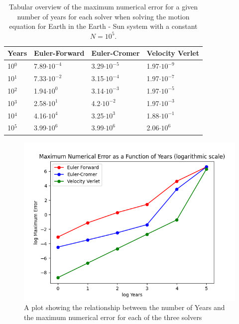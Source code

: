 	\begin{table}[H]
		\centering
		\caption{Tabular overview of the maximum numerical error for a given number of years for each solver when solving the motion equation for Earth in the Earth - Sun system with a constant $N = 10^{5}$.}
		\label{error_constN}
		\begin{tabular}{l|l|l|l}
			Years & Euler-Forward & Euler-Cromer & Velocity Verlet\\
			\hline
			10$^0$ &7.89$\cdot10^{-4}$&3.29$\cdot10^{-5}$ &1.97$\cdot10^{-9}$\\
			10$^1$ &7.33$\cdot10^{-2}$ &3.15$\cdot10^{-4}$ &1.97$\cdot10^{-7}$ \\
			10$^2$ &1.94$\cdot10^{0}$ &3.14$\cdot10^{-3}$ &1.97$\cdot10^{-5}$ \\
			10$^3$ &2.58$\cdot10^{1}$ &4.2$\cdot10^{-2}$ &1.97$\cdot10^{-3}$ \\
			10$^4$ & 4.16$\cdot10^{4}$&3.25$\cdot10^{3}$ &1.88$\cdot10^{-1}$ \\
			10$^5$ &3.99$\cdot10^{6}$ &3.99$\cdot10^{6}$ &2.06$\cdot10^{6}$
		\end{tabular}
	\end{table}
	\begin{figure}[H]
		\includegraphics[width = \linewidth]{Figure/maxerrorplotconstN.png}
		\caption{A plot showing the relationship between the number of Years and the maximum numerical error for each of the three solvers}
		\label{maxerrorconstN_plot}
	\end{figure}

